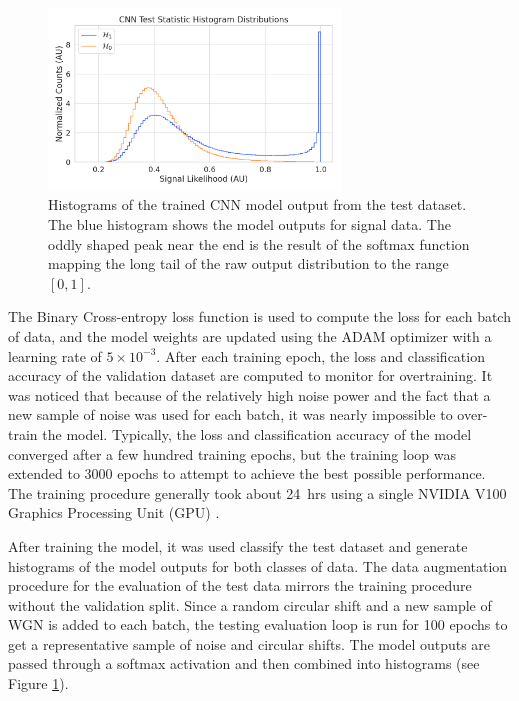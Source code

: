 \begin{figure}[htbp]
    \centering
    \includegraphics[width=0.69\textwidth]{figs/Chapter-4/230831_cnn_test_stat_hist.png}
    \caption{Histograms of the trained CNN model output from the test dataset. The blue histogram shows the model outputs for signal data. The oddly shaped peak near the end is the result of the softmax function mapping the long tail of the raw output distribution to the range $[0,1]$. }
    \label{fig:cnn_histogram}
\end{figure}

The Binary Cross-entropy loss function is used to compute the loss for each batch of data, and the model weights are updated using the ADAM optimizer with a learning rate of $5\times10^{-3}$. After each training epoch, the loss and classification accuracy of the validation dataset are computed to monitor for overtraining. It was noticed that because of the relatively high noise power and the fact that a new sample of noise was used for each batch, it was nearly impossible to over-train the model. Typically, the loss and classification accuracy of the model converged after a few hundred training epochs, but the training loop was extended to 3000 epochs to attempt to achieve the best possible performance. The training procedure generally took about 24~hrs using a single NVIDIA V100 Graphics Processing Unit (GPU) \cite{v100}.

After training the model, it was used classify the test dataset and generate histograms of the model outputs for both classes of data. The data augmentation procedure for the evaluation of the test data mirrors the training procedure without the validation split. Since a random circular shift and a new sample of WGN is added to each batch, the testing evaluation loop is run for 100 epochs to get a representative sample of noise and circular shifts. The model outputs are passed through a softmax activation and then combined into histograms (see Figure \ref{fig:cnn_histogram}).

